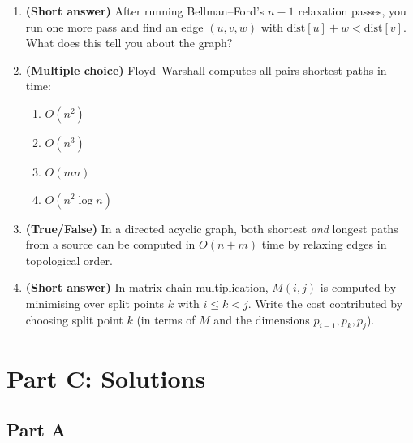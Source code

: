 \documentclass[11pt]{article}
\begin{document}
\begin{enumerate}[label=\textbf{B\arabic*.}, leftmargin=2.2em]
\item \textbf{(Short answer)} After running Bellman--Ford's $n-1$ relaxation passes, you run
one more pass and find an edge $(u,v,w)$ with $\mathrm{dist}[u] + w < \mathrm{dist}[v]$.
What does this tell you about the graph?

\item \textbf{(Multiple choice)} Floyd--Warshall computes all-pairs shortest paths in time:
\begin{enumerate}[label=(\alph*)]
    \item $O(n^2)$
    \item $O(n^3)$
    \item $O(mn)$
    \item $O(n^2 \log n)$
\end{enumerate}

\item \textbf{(True/False)} In a directed acyclic graph, both shortest \emph{and} longest
paths from a source can be computed in $O(n+m)$ time by relaxing edges in topological order.

\item \textbf{(Short answer)} In matrix chain multiplication, $M(i,j)$ is computed by
minimising over split points $k$ with $i \le k < j$. Write the cost contributed by choosing
split point $k$ (in terms of $M$ and the dimensions $p_{i-1}, p_k, p_j$).

\end{enumerate}

\newpage
\section*{Part C: Solutions}

\subsection*{Part A}
\end{document}
